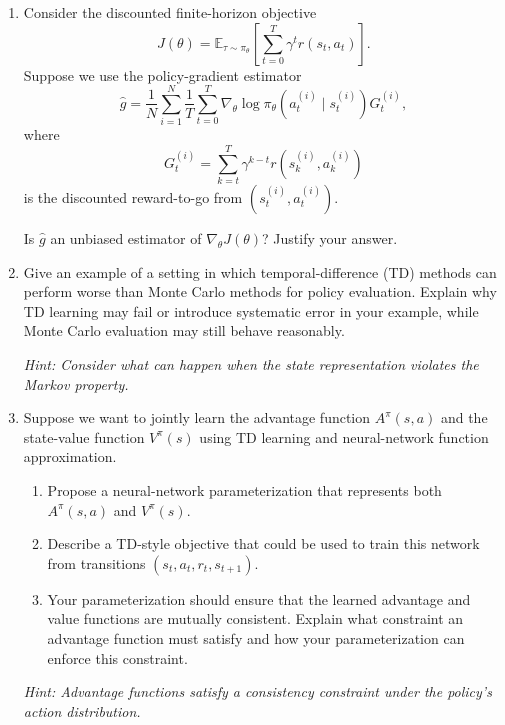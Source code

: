 \documentclass[12pt]{article}
\begin{document}
\begin{enumerate}[leftmargin=*]

  \item Consider the discounted finite-horizon objective
  \[
    J(\theta)
    =
    \mathbb{E}_{\tau \sim \pi_\theta}
    \left[
      \sum_{t=0}^{T} \gamma^t r(s_t,a_t)
    \right].
  \]
  Suppose we use the policy-gradient estimator
  \[
    \hat{g}
    =
    \frac{1}{N}
    \sum_{i=1}^{N}
    \frac{1}{T}
    \sum_{t=0}^{T}
    \nabla_\theta
    \log \pi_\theta
    \left(a_t^{(i)} \mid s_t^{(i)}\right)
    G_t^{(i)},
  \]
  where
  \[
    G_t^{(i)}
    =
    \sum_{k=t}^{T}
    \gamma^{k-t}
    r\left(s_k^{(i)},a_k^{(i)}\right)
  \]
  is the discounted reward-to-go from $(s_t^{(i)},a_t^{(i)})$.

  Is $\hat{g}$ an unbiased estimator of $\nabla_\theta J(\theta)$?
  Justify your answer.

  \item Give an example of a setting in which temporal-difference (TD) methods
  can perform worse than Monte Carlo methods for policy evaluation. Explain
  why TD learning may fail or introduce systematic error in your example,
  while Monte Carlo evaluation may still behave reasonably.

  \textit{Hint: Consider what can happen when the state representation violates
  the Markov property.}

  \item Suppose we want to jointly learn the advantage function
  $A^\pi(s,a)$ and the state-value function $V^\pi(s)$ using TD learning and
  neural-network function approximation.

  \begin{enumerate}
    \item Propose a neural-network parameterization that represents both
    $A^\pi(s,a)$ and $V^\pi(s)$.

    \item Describe a TD-style objective that could be used to train this
    network from transitions $(s_t,a_t,r_t,s_{t+1})$.

    \item Your parameterization should ensure that the learned advantage and
    value functions are mutually consistent. Explain what constraint an
    advantage function must satisfy and how your parameterization can enforce
    this constraint.
  \end{enumerate}

  \textit{Hint: Advantage functions satisfy a consistency constraint under the
  policy's action distribution.}


\end{enumerate}
\end{document}
